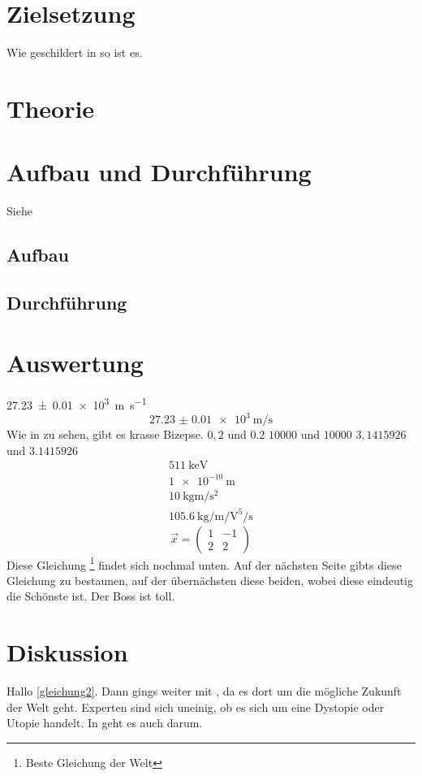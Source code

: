 \maketitle
\tableofcontents
\newpage

\section{Zielsetzung}
Wie geschildert in \cite{anleitung} so ist es.

\section{Theorie}
\section{Aufbau und Durchführung}
  Siehe
  \subsection{Aufbau}
  \subsection{Durchführung}
\newpage

\section{Auswertung}
\SI{27.23(1)e3}{\meter\per\second}
\begin{equation}
  \SI{27.23(1)e3}{\meter\per\second}
\end{equation}
Wie in \cite[4]{hallo} zu sehen, gibt es krasse Bizepse.
$0,2$ und $\num{0,2}$
$10000$ und $\num{10000}$
$3,1415926$ und $\num{3,1415926}$
\begin{gather}
  \SI{511}{\kilo\electronvolt} \\
  \SI{1e-10}{\metre} \\
  \SI{10}{\kilo\gram\meter\per\second\squared} \\
  \SI{105.6}{\kilo\gram\per\meter\per\volt\tothe{5}\per\second}
\end{gather}
\begin{equation}
  \vec{x} = \begin{pmatrix}
  1 & -1 \\
  2 & 2
  \end{pmatrix}
  \label{gleichung2}
\end{equation}
Diese Gleichung \footnote{Beste Gleichung der Welt} findet sich nochmal unten.
Auf der nächsten Seite gibts diese Gleichung zu bestaunen, auf der übernächsten diese beiden,
wobei diese eindeutig die Schönste ist.
Der Boss ist toll.
\newpage
\section{Diskussion}
Hallo \eqref{gleichung2}. Dann gings weiter mit \cite{buch}, da es dort um die mögliche Zukunft der Welt geht. Experten sind sich
uneinig, ob es sich um eine Dystopie oder Utopie handelt. In \cite{kent} geht es auch darum.
\newpage
\nocite{*}
\printbibliography
